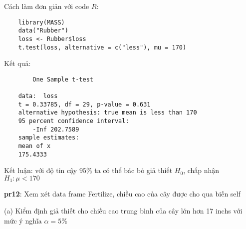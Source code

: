 Cách làm đơn giản với code $R$:
\begin{lstlisting}
    library(MASS)
    data("Rubber")
    loss <- Rubber$loss
    t.test(loss, alternative = c("less"), mu = 170)
\end{lstlisting}
Kết quả:
\begin{lstlisting}
        One Sample t-test

    data:  loss
    t = 0.33785, df = 29, p-value = 0.631
    alternative hypothesis: true mean is less than 170
    95 percent confidence interval:
        -Inf 202.7589
    sample estimates:
    mean of x 
    175.4333 
\end{lstlisting}
Kết luận: với độ tin cậy $95\%$ ta có thể bác bỏ giả thiết $H_0$, chấp nhận $H_1: \mu < 170$

\textbf{pr12}: Xem xét data frame Fertilize, chiều cao của cây được cho qua biến self

(a) Kiểm định giả thiết cho chiều cao trung bình của cây lớn hơn 17 inchs với mức ý nghĩa $\alpha = 5\%$